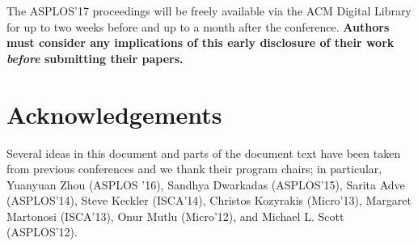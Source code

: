 \documentclass[pageno]{jpaper}
\begin{document}
The ASPLOS'17 proceedings will be freely available via the ACM Digital
Library for up to two weeks before and up to a month after the
conference. {\bf Authors must consider any implications of this early
disclosure of their work {\em before} submitting their papers.}


\section{Acknowledgements}

Several ideas in this document and parts of the document text have
been taken from previous conferences and we thank their program
chairs; in particular, Yuanyuan Zhou (ASPLOS '16), Sandhya Dwarkadas
(ASPLOS'15), Sarita Adve (ASPLOS'14), Steve Keckler (ISCA'14),
Christos Kozyrakis (Micro'13), Margaret Martonosi (ISCA'13), Onur
Mutlu (Micro'12), and Michael L. Scott (ASPLOS'12).



\end{document}
